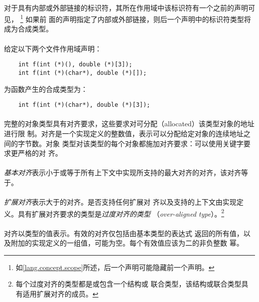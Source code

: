 {\paragraph{}
对于具有内部或外部链接的标识符，其所在作用域中该标识符有一个之前的声明可见，
\footnote{如\ref{lang.concept.scope}所述，后一个声明可能隐藏前一个声明。} 如果前
面的声明指定了内部或外部链接，则后一个声明中的标识符类型将成为合成类型。


\paragraph{}
\ex* 给定以下两个文件作用域声明：
\begin{lstlisting}
    int f(int (*)(), double (*)[3]);
    int f(int (*)(char*), double (*)[]);
\end{lstlisting}
为函数产生的合成类型为：
\begin{lstlisting}
    int f(int (*)(char*), double (*)[3]);
\end{lstlisting}

\paragraph{}
完整的对象类型具有对齐要求，这些要求对可分配（allocated）该类型对象的地址进行限
制。对齐是一个实现定义的整数值，表示可以分配给定对象的连续地址之间的字节数。对象
类型对该类型的每个对象都施加对齐要求：可以使用关键字要求更严格的对
齐。

\paragraph{}
\textit{基本对齐}表示小于或等于所有上下文中实现所支持的最大对齐的对齐，该对齐等
于。

\paragraph{}
\textit{扩展对齐}表示大于的对齐。是否支持任何扩展对
齐以及支持的上下文由实现定义。具有扩展对齐要求的类型是\textit{过度对齐的类型}
（\textit{over-aligned type}）。\footnote{每个过度对齐的类型都是或包含一个结构或
联合类型，该结构或联合类型具有适用扩展对齐的成员。}

\paragraph{}
对齐以类型的值表示。有效的对齐仅包括由基本类型的表达式
返回的所有值，以及附加的实现定义的一组值，可能为空。每个有效值应该为二的非负整数
幂。

}
